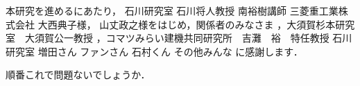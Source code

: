 本研究を進めるにあたり，
石川研究室
石川将人教授
南裕樹講師
三菱重工業株式会社
大西典子様，
山丈政之様をはじめ，関係者のみなさま
，大須賀杉本研究室　大須賀公一教授
，コマツみらい建機共同研究所　吉灘　裕　特任教授
石川研究室
増田さん
ファンさん
石村くん
その他みんな
に感謝します．

順番これで問題ないでしょうか．